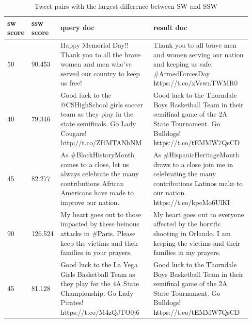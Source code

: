 {%
\begin{table}[]
\tiny
\centering
\caption{Tweet pairs with the largest difference between SW and SSW}
\label{tbl:diff}
\begin{tabular}{|p{}|p{}|p{}|p{}|}
\hline
sw score & ssw score                   & query doc                                                                                                                                               & result doc                                                                                                                                          \\ \hline
50       & 90.453                      & Happy Memorial Day!! Thank you to all the brave women and men who've served our country to keep us free!                                                & Thank you to all brave men and women serving our nation and keeping us safe. \#ArmedForcesDay https://t.co/xVswnTWMR0                               \\ \hline
40       & 79.346 &Good luck to the @CSHighSchool girls soccer team as they play in the state semifinals. Go Lady Cougars! http://t.co/Zf4MTANhNM     & Good luck to the Thorndale Boys Basketball Team in their semifinal game of the 2A State Tournament. Go Bulldogs! https://t.co/tEMMW7QsCD            \\ \hline
45       & 82.277                      & As \#BlackHistoryMonth comes to a close, let us always celebrate the many contributions African Americans have made to improve our nation.              & As \#HispanicHeritageMonth draws to a close join me in celebrating the many contributions Latinos make to our nation. https://t.co/kpeMo6UlKI       \\ \hline
90       & 126.524                     & My heart goes out to those impacted by these heinous attacks in \#Paris. Please keep the victims and their families in your prayers.                    & My heart goes out to everyone affected by the horrific shooting in Orlando. I am keeping the victims and their families in my prayers.              \\ \hline
45       & 81.128                      & Good luck to the La Vega Girls Basketball Team as they play for the 4A State Championship. Go Lady Pirates! https://t.co/M4zQJTO0j6                     & Good luck to the Thorndale Boys Basketball Team in their semifinal game of the 2A State Tournament. Go Bulldogs! https://t.co/tEMMW7QsCD            \\ \hline

\end{tabular}
\end{table}}
